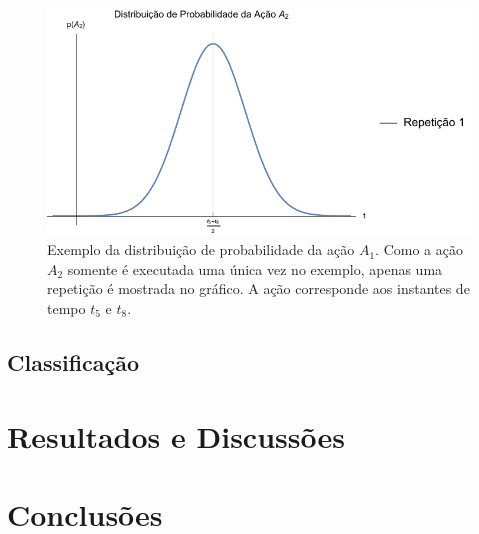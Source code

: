 \begin{figure}[htb]
	\caption{\label{fig:metodo-exemplo-bo-media-a2} Exemplo da distribuição de probabilidade da ação $A_1$. Como a ação $A_2$ somente é executada uma única vez no exemplo, apenas uma repetição é mostrada no gráfico. A ação corresponde aos instantes de tempo $t_5$ e $t_8$.}
	\begin{center}
	    \includegraphics[width=\linewidth]{../Mathematica/Images/Exemplo_BO_Media_A2.pdf}
	\end{center}
\end{figure}

\section{Classificação}

	\chapter{Resultados e Discussões}


	\chapter{Conclusões}



